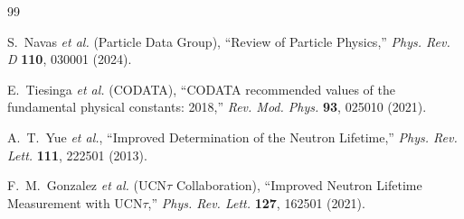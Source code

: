 \documentclass[12pt,a4paper]{article}
\begin{document}
\begin{thebibliography}{99}

S.~Navas \textit{et al.} (Particle Data Group), ``Review of Particle Physics,'' \textit{Phys. Rev. D} \textbf{110}, 030001 (2024).

E.~Tiesinga \textit{et al.} (CODATA), ``CODATA recommended values of the fundamental physical constants: 2018,'' \textit{Rev. Mod. Phys.} \textbf{93}, 025010 (2021).

A.~T.~Yue \textit{et al.}, ``Improved Determination of the Neutron Lifetime,'' \textit{Phys. Rev. Lett.} \textbf{111}, 222501 (2013).

F.~M.~Gonzalez \textit{et al.} (UCN$\tau$ Collaboration), ``Improved Neutron Lifetime Measurement with UCN$\tau$,'' \textit{Phys. Rev. Lett.} \textbf{127}, 162501 (2021).

\end{thebibliography}
\end{document}
